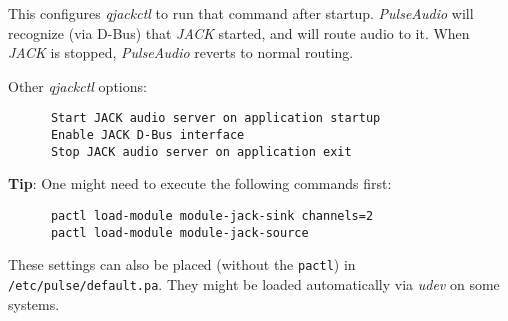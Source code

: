    This configures \textsl{qjackctl} to run that command after startup.
   \textsl{PulseAudio} will recognize (via D-Bus) that \textsl{JACK} started,
   and will route audio to it. When \textsl{JACK} is stopped,
   \textsl{PulseAudio} reverts to normal routing.

   Other \textsl{qjackctl} options:

   \begin{verbatim}
      Start JACK audio server on application startup
      Enable JACK D-Bus interface
      Stop JACK audio server on application exit
   \end{verbatim}

   \textbf{Tip}:
   One might need to execute the following commands first:

   \begin{verbatim}
      pactl load-module module-jack-sink channels=2
      pactl load-module module-jack-source
   \end{verbatim}

   These settings can also be placed (without the \texttt{pactl}) in
   \texttt{/etc/pulse/default.pa}.
   They might be loaded automatically via \textsl{udev} on some systems.

